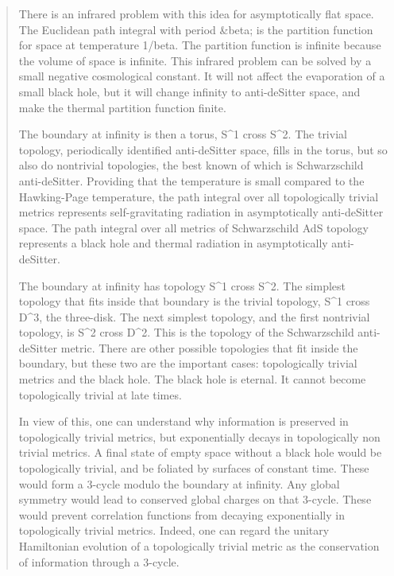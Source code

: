 \begin{quote}
     There is an infrared problem with this idea for asymptotically flat
     space.  The Euclidean path integral with period &beta; is the partition
     function for space at temperature 1/beta. The partition function 
     is infinite because the volume of space is infinite.  This infrared 
     problem can be solved by a small negative cosmological constant.  
     It will not affect the evaporation of a small black hole, but it will 
     change infinity to anti-deSitter space, and make the thermal partition 
     function finite.

     The boundary at infinity is then a torus, S^{1} cross S^{2}.  The trivial
     topology, periodically identified anti-deSitter space, fills in the 
     torus, but so also do nontrivial topologies, the best known of which 
     is Schwarzschild anti-deSitter.  Providing that the temperature is 
     small compared to the Hawking-Page temperature, the path integral 
     over all topologically trivial metrics represents self-gravitating 
     radiation in asymptotically anti-deSitter space.   The path integral 
     over all metrics of Schwarzschild AdS topology represents a black 
     hole and thermal radiation in asymptotically anti-deSitter.

     The boundary at infinity has topology S^{1} cross S^{2}.  The simplest
     topology that fits inside that boundary is the trivial topology, 
     S^{1} cross D^{3}, the three-disk. The next simplest topology, and 
     the first nontrivial topology, is S^{2} cross D^{2}.  
This is the 
     topology of the Schwarzschild anti-deSitter metric.  There are 
     other possible topologies that fit inside the boundary, but these 
     two are the important cases: topologically trivial metrics and 
     the black hole.  The black hole is eternal.  It cannot become 
     topologically trivial at late times.

     In view of this, one can understand why information is preserved in
     topologically trivial metrics, but exponentially decays in 
     topologically non trivial metrics.  A final state of empty space
     without a black hole would be topologically trivial, and be foliated
     by surfaces of constant time.  These would form a 3-cycle modulo
     the boundary at infinity.  Any global symmetry would lead to
     conserved global charges on that 3-cycle.  These would prevent
     correlation functions from decaying exponentially in topologically
     trivial metrics.  Indeed, one can regard the unitary Hamiltonian
     evolution of a topologically trivial metric as the conservation of
     information through a 3-cycle.


\end{quote}
